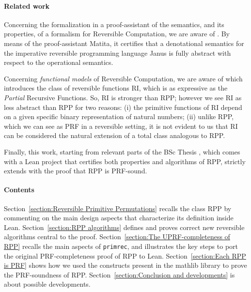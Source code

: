 \documentclass[preprint]{elsarticle}
\theoremstyle{remark}
\newcommand{\RPP}{\textsf{RPP}\xspace}
\newcommand{\PRF}{\textsf{PRF}\xspace}
\newcommand{\MATHLIB}{\textsf{mathlib}\xspace}
\newcommand{\LEAN}{\textsf{Lean}\xspace}
\newcommand{\JMF}{\textsf{RI}\xspace} %
\newcommand{\Janus}{\textsf{Janus}\xspace}
\newcommand{\Matita}{\textsf{Matita}\xspace}
\begin{document}
\paragraph{Related work}
Concerning the formalization in a proof-assistant of the semantics, and its properties, of a formalism for Reversible Computation, we are aware of \cite{paoliniTYPES2015}. By means of the proof-assistant \Matita \cite{Asperti2007}, it certifies that a denotational semantics for the imperative reversible programming language \Janus \cite[Section 8.3.3]{perumalla2013chc} is fully abstract with respect to the operational semantics.

Concerning \emph{functional models} of Reversible Computation, we are aware of \cite{jacopini89tcs} which introduces the class of reversible functions \JMF, which is as expressive as the \emph{Partial} Recursive Functions. So, \JMF is stronger than \RPP; however we see \JMF as less abstract than \RPP for two reasons: (i) the primitive functions of \JMF depend on a given specific binary representation of natural numbers; (ii) unlike \RPP, which we can see as \PRF in a reversible setting, it is not evident to us that \JMF can be considered the natural extension of a total class analogous to \RPP.

Finally, this work, starting from relevant parts of the BSc Thesis \cite{MalettoBSc2021}, which comes with a \LEAN project \cite{MalettoRPPLEAN2021} that certifies both properties and algorithms of \RPP, strictly extends \cite{MalettoR22} with the proof that \RPP is \PRF-sound.

\paragraph{Contents}
Section~\ref{section:Reversible Primitive Permutations} recalls the class \RPP by commenting on the main design aspects that characterize its definition inside \LEAN.
Section~\ref{section:RPP algorithms} defines and proves correct new reversible algorithms central to the proof.
Section~\ref{section:The UPRF-completeness of RPP} recalls the main aspects of \lstinline|primrec|, and illustrates the key steps to port the original \PRF-completeness proof of \RPP to \LEAN.
Section~\ref{section:Each RPP is PRF} shows how we used the constructs present in the \MATHLIB library to prove the \PRF-soundness of \RPP.
Section~\ref{section:Conclusion and developments} is about possible developments.

\end{document}

